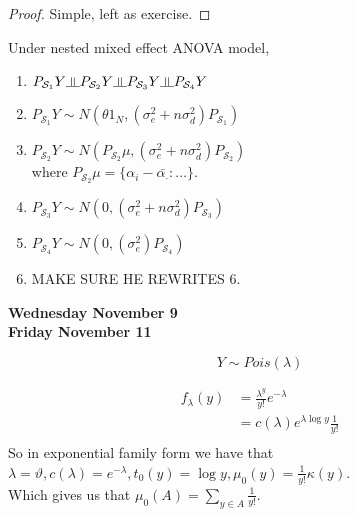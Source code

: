 \documentclass[11pt,fleqn]{book} %
\newcommand{\indep}{\rotatebox[origin=c]{90}{$\models$}}
\begin{document}
\begin{proof}
	Simple, left as exercise.
\end{proof}

\begin{theorem}
	Under nested mixed effect ANOVA model, 

		\begin{enumerate}
			\item $P_{\mathcal{S}_1}Y \indep P_{\mathcal{S}_2}Y \indep P_{\mathcal{S}_3}Y \indep P_{\mathcal{S}_4}Y$
			\item $P_{\mathcal{S}_1}Y \sim N (\theta 1_N, (\sigma_e^2 + n \sigma_d^2)P_{\mathcal{S}_1}) $
			\item $P_{\mathcal{S}_2}Y \sim N (P_{\mathcal{S}_2}\mu, (\sigma_e^2 + n \sigma_d^2)P_{\mathcal{S}_2}) $\\

			where $P_{\mathcal{S}_2}\mu = \{\alpha_i - \bar{\alpha_\cdot}: \dots\}$.

			\item $P_{\mathcal{S}_3}Y \sim N (0, (\sigma_e^2 + n \sigma_d^2)P_{\mathcal{S}_3}) $


			\item $P_{\mathcal{S}_4}Y \sim N (0, (\sigma_e^2 )P_{\mathcal{S}_4}) $
			\item MAKE SURE HE REWRITES 6.

		\end{enumerate}
\end{theorem}
 

\textbf{Wednesday November 9}\\

\textbf{Friday November 11}\\


\begin{example}
			$$Y \sim Pois(\lambda)$$

			\begin{align*}
				f_\lambda(y) &= \frac{\lambda^y}{y!} e^{-\lambda}\\
						&=c(\lambda) e^{\lambda \log y} \frac{1}{y!}\\
			\end{align*}
So in exponential family form we have that $\lambda = \vartheta, c(\lambda) = e^{-\lambda}, t_0(y) = \log y, \mu_0(y) = \frac{1}{y!} \kappa(y)$.\\

Which gives us that $\mu_0(A) = \sum_{y \in A} \frac{1}{y!}$.\\
\end{example}
\end{document}
